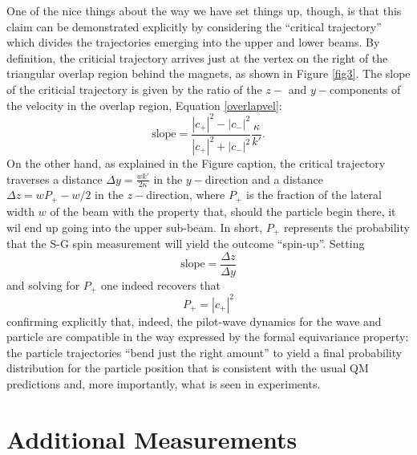 \documentclass[aps,prc,onecolumn,letterpaper,floatfix,12pt]{revtex4}
\begin{document}
One of the nice things about the way we have set things up, though, is
that this claim can be demonstrated explicitly by considering the
``critical trajectory'' \cite{bh} which divides the trajectories emerging into
the upper and lower beams.  By definition, the criticial trajectory
arrives just at the vertex on the right of the triangular overlap
region behind the magnets, as shown in Figure \ref{fig3}. 
The slope of the criticial trajectory is given by the ratio of the
$z-$ and $y-$components of the velocity in the overlap region,
Equation \eqref{overlapvel}:
\begin{equation}
\text{slope} = \frac{|c_+|^2 - |c_-|^2}{|c_+|^2+|c_-|^2}
\frac{\kappa}{k'}.
\end{equation}
On the other hand, as explained in the Figure caption, the critical
trajectory traverses a distance $\Delta y = \frac{w k'}{2 \kappa}$ in
the $y-$direction and a distance $\Delta z = wP_+ - w/2$ in the
$z-$direction, where $P_+$ is the fraction of the lateral width $w$ of
the beam with the property that, should the particle begin there, it
wil end up going into the upper sub-beam.  In short, $P_+$
represents the probability that the S-G spin measurement will yield
the outcome ``spin-up''.   Setting
\begin{equation}
\text{slope} = \frac{\Delta z}{\Delta y}
\end{equation}
and solving for $P_+$ one indeed recovers that
\begin{equation}
P_+ = |c_+|^2
\end{equation}
confirming explicitly that, indeed, the pilot-wave dynamics for the
wave and particle are compatible in the way expressed by the formal
equivariance property:  the particle trajectories ``bend just the
right amount'' to yield a final probability distribution for the
particle position that is consistent with the usual QM predictions
and, more importantly, what is seen in experiments. 



\section{Additional Measurements}
\label{sec4}
\end{document}
